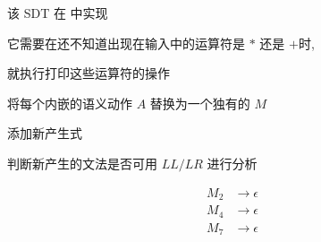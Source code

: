 \begin{frame}{}
  \begin{center}
    该 SDT 在  中实现


    \pause
    \vspace{0.50cm}
    它需要在还不知道出现在输入中的运算符是 $\ast$ 还是 $+$时,

    \vspace{0.30cm}
    就执行打印这些运算符的操作
  \end{center}
\end{frame}

\begin{frame}{}
  \begin{center}

    \pause
    \vspace{1.20cm}
    将每个内嵌的语义动作 $A$ 替换为一个独有的 $M$

    \vspace{0.60cm}
    添加新产生式 

    \vspace{0.60cm}
    判断新产生的文法是否可用 $LL/LR$ 进行分析
  \end{center}
\end{frame}

\begin{frame}{}
  \begin{center}

    \begin{align*}
      M_{2} &\to \epsilon \\
      M_{4} &\to \epsilon \\
      M_{7} &\to \epsilon
    \end{align*}
  \end{center}
\end{frame}

